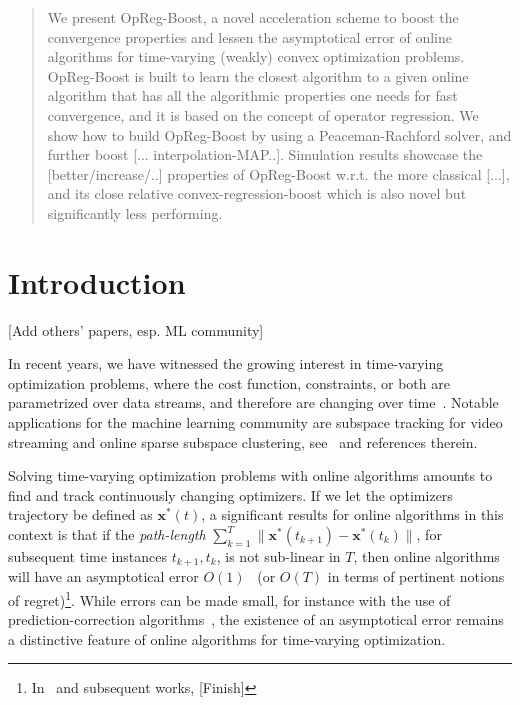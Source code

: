 \documentclass{article}
\newcommand{\x}{\mathbold{x}}
\begin{document}
\printAffiliationsAndNotice{}  %

\begin{abstract}
We present OpReg-Boost, a novel acceleration scheme to boost the convergence properties and lessen the asymptotical error of online algorithms for time-varying (weakly) convex optimization problems. OpReg-Boost is built to learn the closest algorithm to a given online algorithm that has all the algorithmic properties one needs for fast convergence, and it is based on the concept of operator regression. We show how to build OpReg-Boost by using a Peaceman-Rachford solver, and further boost [... interpolation-MAP..]. Simulation results showcase the [better/increase/..] properties of OpReg-Boost w.r.t. the more classical [...], and its close relative convex-regression-boost which is also novel but significantly less performing.  
\end{abstract}


\section{Introduction}\label{sec:introduction}

[Add others' papers, esp. ML community]


In recent years, we have witnessed the growing interest in time-varying optimization problems, where the cost function, constraints, or both are parametrized over data streams, and therefore are changing over time~\cite{Jadbabaie2015, SPM}. Notable applications for the machine learning community are subspace tracking for video streaming and online sparse subspace clustering, see~\cite{Asif2014, Akhriev2020, SPM} and references therein. 

Solving time-varying optimization problems with online algorithms amounts to find and track continuously changing optimizers. If we let the optimizers trajectory be defined as $\x^*(t)$, a significant results for online algorithms in this context is that if the \emph{path-length} $\sum_{k=1}^T \|\x^*(t_{k+1}) - \x^*(t_{k})\|$, for subsequent time instances $t_{k+1}, t_k$, is not sub-linear in $T$, then online algorithms will have an asymptotical error $O(1)$~\cite{Besbes2013, Jadbabaie2015, SPM, NaLi2020} (or $O(T)$ in terms of pertinent notions of regret)\footnote{
In~\cite{Jadbabaie2015} and subsequent works, [Finish]
}. While errors can be made small, for instance with the use of prediction-correction algorithms~\cite{Dontchev2013, simonetto_time-varying_2020}, the existence of an asymptotical error remains a distinctive feature of online algorithms for time-varying optimization. 
\end{document}
